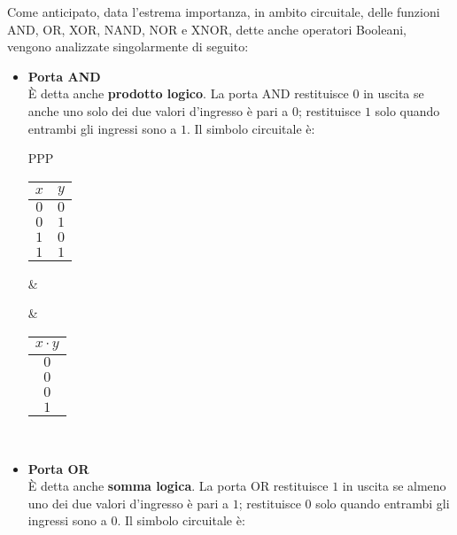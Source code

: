 \documentclass[a4paper]{extarticle}
\begin{document}
\noindent
Come anticipato, data l’estrema importanza, in ambito circuitale, delle funzioni AND, OR, XOR, NAND, NOR e XNOR, dette anche operatori Booleani, vengono analizzate singolarmente di seguito:

\begin{itemize}
    \item \textbf{Porta AND}\\
    È detta anche \textbf{prodotto logico}. La porta AND restituisce \(0\) in uscita se anche uno solo dei due valori d’ingresso è pari a \(0\); restituisce \(1\) solo quando entrambi gli ingressi sono a \(1\). Il simbolo circuitale è:

    \vspace{1em}
    \noindent
    \begin{tabularx}{\textwidth}{PPP}
    {
        \begin{tabular}{c|c}
             \(x\) & \(y\)\\
             \hline
             $0$ & $0$\\
             $0$ & $1$\\
             $1$ & $0$\\
             $1$ & $1$
        \end{tabular}
    }
    &
    {
    }
    &
    {
        \begin{tabular}{c}
             \(x \cdot y\)\\
             \hline
             $0$\\
             $0$\\
             $0$\\
             $1$
        \end{tabular}
    }\\
    \end{tabularx}
    \vspace{1em}
    \noindent

    \item \textbf{Porta OR}\\
    È detta anche \textbf{somma logica}. La porta OR restituisce \(1\) in uscita se almeno uno dei due valori d’ingresso è pari a \(1\); restituisce \(0\) solo quando entrambi gli ingressi sono a \(0\). Il simbolo circuitale è:


\end{itemize}
\end{document}
